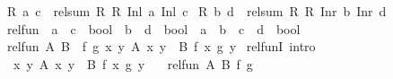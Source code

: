 \begin{isabellebody}
\isanewline
\ \ {\isachardoublequoteopen}R{}\ a\ c\ {\isasymLongrightarrow}\ rel{\isacharunderscore}{\kern0pt}sum\ R{}\ R{}\ {\isacharparenleft}{\kern0pt}Inl\ a{\isacharparenright}{\kern0pt}\ {\isacharparenleft}{\kern0pt}Inl\ c{\isacharparenright}{\kern0pt}{\isachardoublequoteclose}\isanewline
{\isacharbar}{\kern0pt}\ {\isachardoublequoteopen}R{}\ b\ d\ {\isasymLongrightarrow}\ rel{\isacharunderscore}{\kern0pt}sum\ R{}\ R{}\ {\isacharparenleft}{\kern0pt}Inr\ b{\isacharparenright}{\kern0pt}\ {\isacharparenleft}{\kern0pt}Inr\ d{\isacharparenright}{\kern0pt}{\isachardoublequoteclose}\isanewline
\isanewline
{}\isamarkupfalse%
\isanewline
\ \ rel{\isacharunderscore}{\kern0pt}fun\ {\isacharcolon}{\kern0pt}{\isacharcolon}{\kern0pt}\ {\isachardoublequoteopen}{\isacharparenleft}{\kern0pt}{\isacharprime}{\kern0pt}a\ {\isasymRightarrow}\ {\isacharprime}{\kern0pt}c\ {\isasymRightarrow}\ bool{\isacharparenright}{\kern0pt}\ {\isasymRightarrow}\ {\isacharparenleft}{\kern0pt}{\isacharprime}{\kern0pt}b\ {\isasymRightarrow}\ {\isacharprime}{\kern0pt}d\ {\isasymRightarrow}\ bool{\isacharparenright}{\kern0pt}\ {\isasymRightarrow}\ {\isacharparenleft}{\kern0pt}{\isacharprime}{\kern0pt}a\ {\isasymRightarrow}\ {\isacharprime}{\kern0pt}b{\isacharparenright}{\kern0pt}\ {\isasymRightarrow}\ {\isacharparenleft}{\kern0pt}{\isacharprime}{\kern0pt}c\ {\isasymRightarrow}\ {\isacharprime}{\kern0pt}d{\isacharparenright}{\kern0pt}\ {\isasymRightarrow}\ bool{\isachardoublequoteclose}\isanewline
{}\isanewline
\ \ {\isachardoublequoteopen}rel{\isacharunderscore}{\kern0pt}fun\ A\ B\ {\isacharequal}{\kern0pt}\ {\isacharparenleft}{\kern0pt}{\isasymlambda}f\ g{\isachardot}{\kern0pt}\ {\isasymforall}x\ y{\isachardot}{\kern0pt}\ A\ x\ y\ {\isasymlongrightarrow}\ B\ {\isacharparenleft}{\kern0pt}f\ x{\isacharparenright}{\kern0pt}\ {\isacharparenleft}{\kern0pt}g\ y{\isacharparenright}{\kern0pt}{\isacharparenright}{\kern0pt}{\isachardoublequoteclose}\isanewline
\isanewline
{}\isamarkupfalse%
\ rel{\isacharunderscore}{\kern0pt}funI\ {\isacharbrackleft}{\kern0pt}intro{\isacharbrackright}{\kern0pt}{\isacharcolon}{\kern0pt}\isanewline
\ \ \ {\isachardoublequoteopen}{\isasymAnd}x\ y{\isachardot}{\kern0pt}\ A\ x\ y\ {\isasymLongrightarrow}\ B\ {\isacharparenleft}{\kern0pt}f\ x{\isacharparenright}{\kern0pt}\ {\isacharparenleft}{\kern0pt}g\ y{\isacharparenright}{\kern0pt}{\isachardoublequoteclose}\isanewline
\ \ \ {\isachardoublequoteopen}rel{\isacharunderscore}{\kern0pt}fun\ A\ B\ f\ g{\isachardoublequoteclose}\isanewline

\end{isabellebody}
